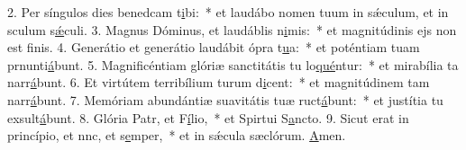 2. Per síngulos dies benedcam t\uline{i}bi:~* et laudábo nomen tuum in sǽculum, et in sculum s\uline{ǽ}culi.
3. Magnus Dóminus, et laudáblis n\uline{i}mis:~* et magnitúdinis ejs non est f\uline{i}nis.
4. Generátio et generátio laudábit ópra t\uline{u}a:~* et poténtiam tuam prnunti\uline{á}bunt.
5. Magnificéntiam glóriæ sanctitátis tu lo\uline{qué}ntur:~* et mirabília ta narr\uline{á}bunt.
6. Et virtútem terribílium turum d\uline{i}cent:~* et magnitúdinem tam narr\uline{á}bunt.
7. Memóriam abundántiæ suavitátis tuæ ruct\uline{á}bunt:~* et justítia tu exsult\uline{á}bunt.
8. Glória Patr, et F\uline{í}lio,~* et Spirtui S\uline{a}ncto.
9. Sicut erat in princípio, et nnc, et s\uline{e}mper,~* et in sǽcula sæclórum. \uline{A}men.
